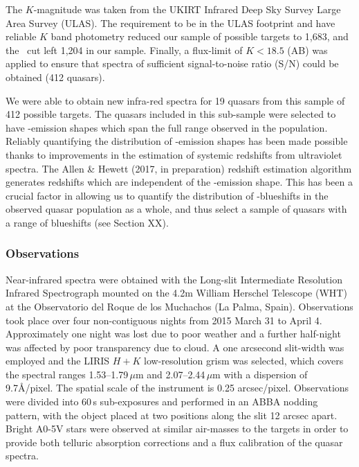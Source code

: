 The $K$-magnitude was taken from the UKIRT Infrared Deep Sky Survey \citep[UKIDSS;][]{lawrence07} Large Area Survey (ULAS). 
The requirement to be in the ULAS footprint and have reliable $K$ band photometry reduced our sample of possible targets to 1,683, and the \ebv\, cut left 1,204 in our sample. 
Finally, a flux-limit of $K<18.5$ (AB) was applied to ensure that spectra of sufficient signal-to-noise ratio (S/N) could be obtained (412 quasars). 
 
We were able to obtain new infra-red spectra for 19 quasars from this sample of 412 possible targets. 
The quasars included in this sub-sample were selected to have -emission shapes which span the full range observed in the population.
Reliably quantifying the distribution of -emission shapes has been made possible thanks to improvements in the estimation of systemic redshifts from ultraviolet spectra. 
The Allen \& Hewett (2017, in preparation) redshift estimation algorithm generates redshifts which are independent of the -emission shape.
This has been a crucial factor in allowing us to quantify the distribution of -blueshifts in the observed quasar population as a whole, and thus select a sample of quasars with a range of  blueshifts (see Section XX). 

\subsubsection{Observations}

Near-infrared spectra were obtained with the Long-slit Intermediate Resolution Infrared Spectrograph \citep[LIRIS;][]{manchado98} mounted on the 4.2m William Herschel Telescope (WHT) at the Observatorio del Roque de los Muchachos (La Palma, Spain). 
Observations took place over four non-contiguous nights from 2015 March 31 to April 4. 
Approximately one night was lost due to poor weather and a further half-night was affected by poor transparency due to cloud. 
A one arcsecond slit-width was employed and the LIRIS $H+K$ low-resolution grism was selected, which covers the spectral ranges 1.53--1.79\,$\mu$m and 2.07--2.44\,$\mu$m with a dispersion of 9.7\AA/pixel. 
The spatial scale of the instrument is 0.25 arcsec/pixel. 
Observations were divided into 60\,s sub-exposures and performed in an ABBA nodding pattern, with the object placed at two positions along the slit 12 arcsec apart. 
Bright A0-5V stars were observed at similar air-masses to the targets in order to provide both telluric absorption corrections and a flux calibration of the quasar spectra.

